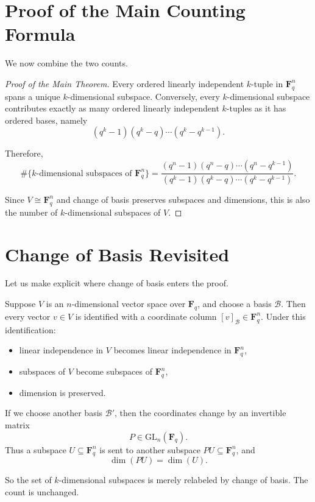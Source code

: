 \documentclass[11pt]{article}
\theoremstyle{definition}
\theoremstyle{remark}
\newcommand{\F}{\mathbf{F}}
\newcommand{\GL}{\mathrm{GL}}
\begin{document}
	\section{Proof of the Main Counting Formula}
	
	We now combine the two counts.
	
	\begin{proof}[Proof of the Main Theorem]
		Every ordered linearly independent \(k\)-tuple in \(\F_q^n\) spans a unique \(k\)-dimensional subspace. Conversely, every \(k\)-dimensional subspace contributes exactly as many ordered linearly independent \(k\)-tuples as it has ordered bases, namely
		\[
		(q^k-1)(q^k-q)\cdots(q^k-q^{k-1}).
		\]
		
		Therefore,
		\[
		\#\{\text{\(k\)-dimensional subspaces of }\F_q^n\}
		=
		\frac{(q^n-1)(q^n-q)\cdots(q^n-q^{k-1})}
		{(q^k-1)(q^k-q)\cdots(q^k-q^{k-1})}.
		\]
		
		Since \(V\cong \F_q^n\) and change of basis preserves subspaces and dimensions, this is also the number of \(k\)-dimensional subspaces of \(V\).
	\end{proof}
	
	\section{Change of Basis Revisited}
	
	Let us make explicit where change of basis enters the proof.
	
	Suppose \(V\) is an \(n\)-dimensional vector space over \(\F_q\), and choose a basis \(\mathcal{B}\). Then every vector \(v\in V\) is identified with a coordinate column \([v]_{\mathcal{B}}\in \F_q^n\). Under this identification:
	
	\begin{itemize}
		\item linear independence in \(V\) becomes linear independence in \(\F_q^n\),
		\item subspaces of \(V\) become subspaces of \(\F_q^n\),
		\item dimension is preserved.
	\end{itemize}
	
	If we choose another basis \(\mathcal{B}'\), then the coordinates change by an invertible matrix
	\[
	P\in\GL_n(\F_q).
	\]
	Thus a subspace \(U\subseteq \F_q^n\) is sent to another subspace \(PU\subseteq \F_q^n\), and
	\[
	\dim(PU)=\dim(U).
	\]
	
	So the set of \(k\)-dimensional subspaces is merely relabeled by change of basis. The count is unchanged.
	
\end{document}

